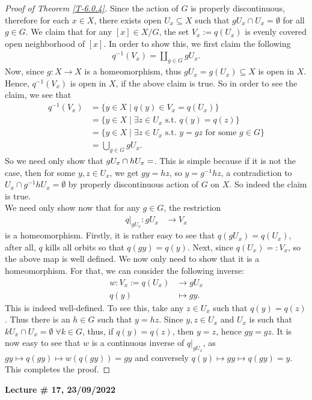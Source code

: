 \documentclass[letterpaper,11pt,twoside]{article}
\theoremstyle{definition}
\theoremstyle{definition}
\theoremstyle{definition}
\theoremstyle{definition}
\theoremstyle{definition}
\theoremstyle{definition}
\theoremstyle{remark}
\theoremstyle{definition}
\newcommand{\rest}[2]{\left. { #1 }\right \vert_{#2}}
\newcommand{\newlecture}[2]{\begin{center}
    \textbf{Lecture \# #1, #2}
\end{center}}
\begin{document}
\begin{proof}[Proof of Theorem \ref{T-6.0.4}]
	Since the action of $ G $ is properly discontinuous, therefore for each $ x\in X $, there exists open $ U_{x} \subseteq X $ such that $ gU_x \cap U_{x} = \emptyset $ for all $ g\in G $. We claim that for any $ [x]\in X/G $, the set $ V_x := q(U_x) $ is evenly covered open neighborhood of $ [x] $. In order to show this, we first claim the following
	\begin{align*}
		q^{-1}(V_x) = \coprod_{g\in G} gU_x.
	\end{align*}
	Now, since $ g :X\to X $ is a homeomorphism, thus $ gU_x = g(U_{x}) \subseteq X$ is open in $ X $. Hence, $ q^{-1}(V_x) $ is open in $ X $, if the above claim is true. So in order to see the claim, we see that
	\begin{align*}
		q^{-1}(V_x) &= \{y\in X\;\vert\; q(y) \in V_x = q(U_x)\}\\
		&= \{y\in X\;\vert\; \exists z\in U_x \text{ s.t. } q(y) = q(z)\}\\
		&= \{y\in X\;\vert\; \exists z\in U_x \text{ s.t. } y = gz \text{ for some }g\in G\}\\
		&= \bigcup_{g\in G} gU_x.
	\end{align*}
	So we need only show that $ gU_x \cap hU_x = \empty $. This is simple because if it is not the case, then for some $y,z\in U_x  $, we get $ gy = hz $, so $ y = g^{-1}hz $, a contradiction to $ U_x \cap g^{-1}h U_x = \emptyset $ by properly discontinuous action of $ G $ on $ X $. So indeed the claim is true. \\
	
	We need only show now that for any $ g\in G $, the restriction
	\begin{align*}
		\rest{q}{gU_x} : gU_x &\longrightarrow V_x
	\end{align*}
 	is a homeomorphism. Firstly, it is rather easy to see that $ q(gU_x) = q(U_x) $, after all, $ q $ kills all orbits so that $ q(gy) = q(y) $. Next, since $ q(U_x) =: V_x $, so the above map is well defined. We now only need to show that it is a homeomorphism. For that, we can consider the following inverse:
 	\begin{align*}
 		w : V_x := q(U_x) &\longrightarrow gU_x\\
 			q(y) &\longmapsto gy.
 	\end{align*}
 	This is indeed well-defined. To see this, take any $ z\in U_x $ such that $ q(y) = q(z) $. Thus there is an $ h\in G $ such that $ y = hz $. Since $ y,z\in U_x $ and $ U_x $ is such that $ kU_x \cap U_x = \emptyset \;\forall k\in G$, thus, if $ q(y) = q(z) $, then $ y=z $, hence $ gy=gz $. It is now easy to see that $ w $ is a continuous inverse of $ \rest{q}{gU_x} $, as $ gy\mapsto q(gy) \mapsto w(q(gy)) = gy $ and conversely $ q(y) \mapsto gy \mapsto q(gy) = y $. This completes the proof.
\end{proof}
\newlecture{17}{23/09/2022}
\end{document}
